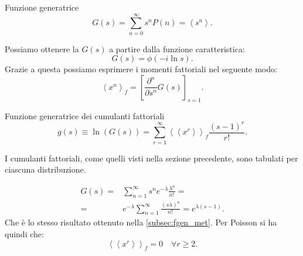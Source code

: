 \begin{redbox}{Funzione generatrice}
    \[
	G(s) = \sum_{n=0}^{\infty} s^n P(n) = \left<s^n\right>
    .\] 
\end{redbox}
\noindent
Possiamo ottenere la $G(s)$ a partire dalla funzione caratteristica:
\[
    G(s) = \phi (-i\ln s) 
.\] 
Grazie a questa possiamo esprimere i momenti fattoriali nel seguente modo:
\[
    \left<x^n\right>_f = \left[\frac{\partial^n}{\partial s^n} G(s)\right]_{s=1}
.\] 
\begin{bluebox}{Funzione generatrice dei cumulanti fattoriali}
    \[
	g(s) \equiv \ln (G(s)) = \sum_{r=1}^{\infty} \left<\left<x^r\right>\right>_f \frac{\left(s-1\right)^r}{r!}
    .\] 
\end{bluebox}
\noindent
I cumulanti fattoriali, come quelli visti nella sezione precedente, sono tabulati per ciascuna distribuzione.
\begin{exmp}
    \[\begin{aligned}
	G(s) =& \sum_{n=1}^{\infty} s^n e^{-\lambda} \frac{\lambda^n}{n!\,} =\\
	=& e^{-\lambda}\sum_{n=1}^{\infty} \frac{\left(s\lambda\right)^n}{n!\,} =  e^{\lambda (s-1) }
     .\end{aligned}\]
     Che è lo stesso risultato ottenuto nella \ref{subsec:fgen_met}.
     Per Poisson si ha quindi che:
     \[
         \left<\left<x^r\right>\right>_f = 0 \quad \forall r \ge  2
     .\] 
\end{exmp}
\noindent
\clearpage
